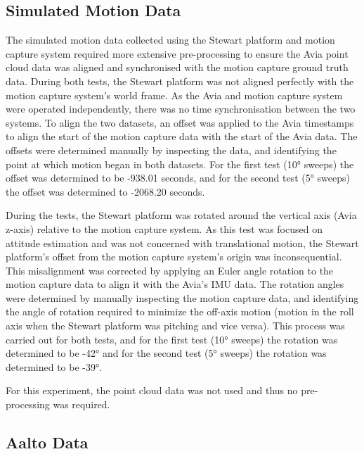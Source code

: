 \subsection{Simulated Motion Data}
\label{subsec:ch5.section1.subsec2}

The simulated motion data collected using the Stewart platform and motion capture system required more extensive pre-processing to ensure the Avia point cloud data was aligned and synchronised with the motion capture ground truth data. During both tests, the Stewart platform was not aligned perfectly with the motion capture system's world frame. As the Avia and motion capture system were operated independently, there was no time synchronisation between the two systems. To align the two datasets, an offset was applied to the Avia timestamps to align the start of the motion capture data with the start of the Avia data. The offsets were determined manually by inspecting the data, and identifying the point at which motion began in both datasets. For the first test (10° sweeps) the offset was determined to be -938.01 seconds, and for the second test (5° sweeps) the offset was determined to -2068.20 seconds.

During the tests, the Stewart platform was rotated around the vertical axis (Avia z-axis) relative to the motion capture system. As this test was focused on attitude estimation and was not concerned with translational motion, the Stewart platform's offset from the motion capture system's origin was inconsequential. This misalignment was corrected by applying an Euler angle rotation to the motion capture data to align it with the Avia's \ac{IMU} data. The rotation angles were determined by manually inspecting the motion capture data, and identifying the angle of rotation required to minimize the off-axis motion (motion in the roll axis when the Stewart platform was pitching and vice versa). This process was carried out for both tests, and for the first test (10° sweeps) the rotation was determined to be -42° and for the second test (5° sweeps) the rotation was determined to be -39°.

For this experiment, the point cloud data was not used and thus no pre-processing was required.

\subsection{Aalto Data}
\label{subsec:ch5.section1.subsec3}

